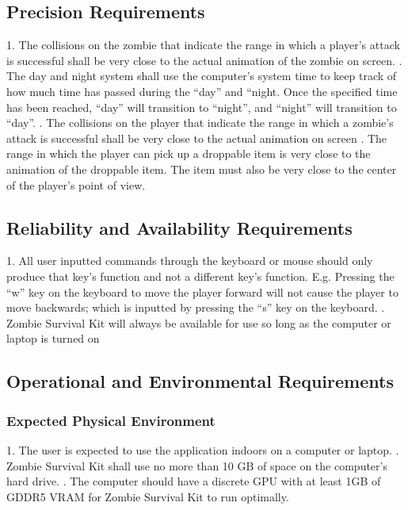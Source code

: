 \documentclass[12pt, titlepage]{article}
\begin{document}
\subsection{Precision Requirements}
1. The collisions on the zombie that indicate the range in which a player’s attack is successful shall be very close to the actual animation of the zombie on screen.
. The day and night system shall use the computer’s system time to keep track of how much time has passed during the “day” and “night. Once the specified time has been reached, “day” will transition to “night”, and “night” will transition to “day”.
. The collisions on the player that indicate the range in which a zombie’s attack is successful shall be very close to the actual animation on screen
. The range in which the player can pick up a droppable item is very close to the animation of the droppable item. The item must also be very close to the center of the player’s point of view.

\subsection{Reliability and Availability Requirements}
1. All user inputted commands through the keyboard or mouse should only produce that key’s function and not a different key’s function.
\newline 
 E.g. Pressing the “w” key on the keyboard to move the player forward will not cause the player to move backwards; which is inputted by pressing the “s” key on the keyboard. 
. Zombie Survival Kit will always be available for use so long as the computer or laptop is turned on


\subsection{Operational and Environmental Requirements}

\subsubsection{Expected Physical Environment}
1. The user is expected to use the application indoors on a computer or laptop.
. Zombie Survival Kit shall use no more than 10 GB of space on the computer’s hard drive.
. The computer should have a discrete GPU with at least 1GB of GDDR5 VRAM for Zombie Survival Kit to run optimally.
\end{document}
